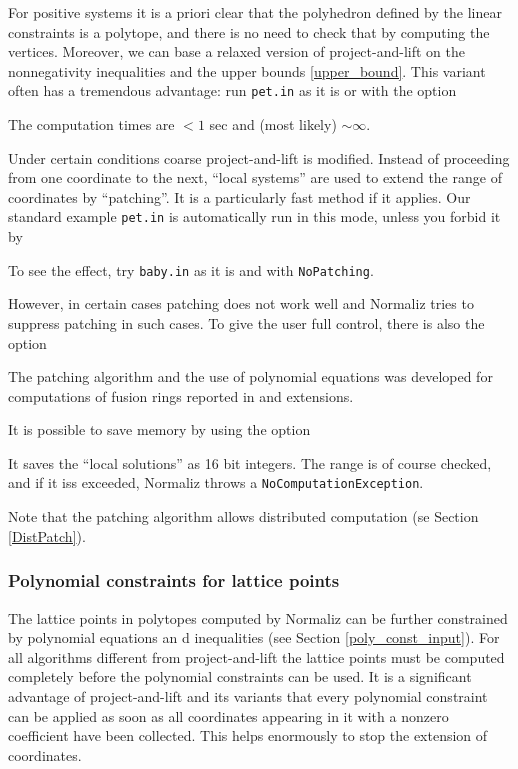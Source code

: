 For positive systems it is a priori clear that the polyhedron defined by the linear constraints is a polytope, and there is no need to check that by computing the vertices. Moreover, we can base a relaxed version of project-and-lift on the nonnegativity inequalities and the upper bounds \ref{upper_bound}.  This variant often has a tremendous advantage: run \verb|pet.in| as it is or with the option
\begin{itemize}
	\itemtt[NoCoarseProjection]
\end{itemize}
The computation times are $< 1$ sec and (most likely) $\sim\infty$.

Under certain conditions coarse project-and-lift is modified. Instead of proceeding from one coordinate to the next, ``local systems'' are used to extend the range of coordinates by ``patching''. It is a particularly fast method if it applies. Our standard example \verb|pet.in| is automatically run in this mode, unless you forbid it by
\begin{itemize}
	\itemtt[NoPatching]
\end{itemize}
To see the effect, try \verb|baby.in| as it is and with \verb|NoPatching|. 

However, in certain cases patching does not work well and Normaliz tries to suppress patching in such cases. To give the user full control, there is also the option
\begin{itemize}
	\itemtt[Patching]
\end{itemize}


The patching algorithm and the use of polynomial equations was developed for computations of fusion rings reported in \cite{ABPP} and extensions.

It is possible  to save memory by using the option
\begin{itemize}
	\itemtt[ShortInt]
\end{itemize}
It saves the ``local solutions'' as 16 bit integers. The range is of course checked, and if it iss exceeded, Normaliz throws a \verb*|NoComputationException|.

Note that the patching algorithm allows distributed computation (se Section \ref{DistPatch}).

\subsubsection{Polynomial constraints for lattice points}\label{poly_const}

The lattice points in polytopes computed by Normaliz can be further constrained by polynomial equations an d inequalities (see Section \ref{poly_const_input}). For all algorithms different from project-and-lift the lattice points must be computed completely before the polynomial constraints can be used. It is a significant advantage of project-and-lift and its variants that every polynomial constraint can be applied as soon as all coordinates appearing  in it with a nonzero coefficient have been collected. This helps enormously to stop the extension of coordinates. 

